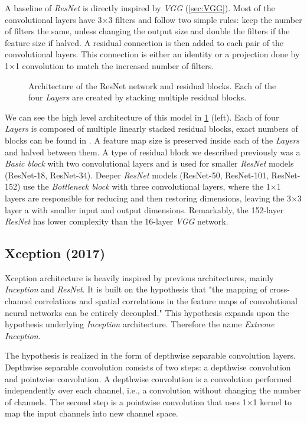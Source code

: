 A baseline of \textit{ResNet} is directly inspired by \textit{VGG} (\cref{sec:VGG}). Most of the convolutional layers have 3$\times$3 filters and follow two simple rules: keep the number of filters the same, unless changing the output size and double the filters if the feature size if halved. A residual connection is then added to each pair of the convolutional layers. This connection is either an identity or a projection done by 1$\times$1 convolution to match the increased number of filters. 

\begin{figure}
    \resnetArch
    \caption{Architecture of the ResNet network and residual blocks. Each of the four \textit{Layers} are created by stacking multiple residual blocks.}
    \label{fig:resnet_arch}
\end{figure}

We can see the high level architecture of this model in \cref{fig:resnet_arch} (left). Each of four \textit{Layers} is composed of multiple linearly stacked residual blocks, exact numbers of blocks can be found in \cite[table 1]{bib:resnet}. A feature map size is preserved inside each of the \textit{Layers} and halved between them. A type of residual block we described previously was a \textit{Basic block} with two convolutional layers and is used for smaller \textit{ResNet} models (ResNet-18, ResNet-34). Deeper \textit{ResNet} models (ResNet-50, ResNet-101, ResNet-152) use the \textit{Bottleneck block} with three convolutional layers, where the 1$\times$1 layers are responsible for reducing and then restoring dimensions, leaving the 3$\times$3 layer a with smaller input and output dimensions. Remarkably, the 152-layer \textit{ResNet} has lower complexity than the 16-layer \textit{VGG} network.



\subsection{Xception (2017)}
\label{sec:xception}
Xception architecture \cite{bib:xception} is heavily inspired by previous architectures, mainly \textit{Inception} and \textit{ResNet}. It is built on the hypothesis that "the mapping of cross-channel correlations and spatial correlations in the feature maps of convolutional neural networks can be entirely decoupled." This hypothesis expands upon the hypothesis underlying \textit{Inception} architecture. Therefore the name \textit{Extreme Inception}. 

The hypothesis is realized in the form of depthwise separable convolution layers. Depthwise separable convolution consists of two steps: a depthwise convolution and pointwise convolution. A depthwise convolution is a convolution performed independently over each channel, i.e., a convolution without changing the number of channels. The second step is a pointwise convolution that uses 1$\times$1 kernel to map the input channels into new channel space.

